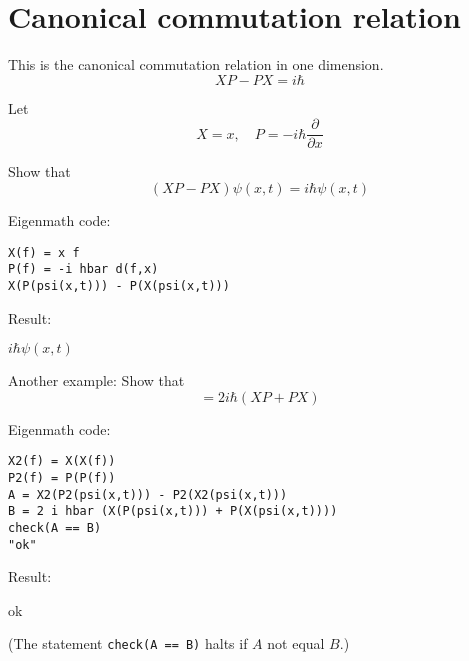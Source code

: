 

\section*{Canonical commutation relation}

This is the canonical commutation relation in one dimension.
\begin{equation*}
XP-PX=i\hbar
\end{equation*}

Let
\begin{equation*}
X=x,\quad P=-i\hbar\frac{\partial}{\partial x}
\end{equation*}

Show that
\begin{equation*}
(XP-PX)\psi(x,t)=i\hbar\psi(x,t)
\end{equation*}

\iffalse
Then
\begin{align*}
(XP-PX)\psi(x,t)&=XP\psi(x,t)-PX\psi(x,t)
\\
&=x\left(-i\hbar\frac{\partial}{\partial x}\psi(x,t)\right)
+i\hbar\frac{\partial}{\partial x}\bigl(x\psi(x,t)\bigr)
\\
&=-i\hbar x\frac{\partial}{\partial x}\psi(x,t)
+i\hbar\left(\frac{\partial}{\partial x}x\right)\psi(x,t)
+i\hbar x\frac{\partial}{\partial x}\psi(x,t)
\\
&=i\hbar\psi(x,t)
\end{align*}
\fi

Eigenmath code:
{\color{blue}
\begin{verbatim}
X(f) = x f
P(f) = -i hbar d(f,x)
X(P(psi(x,t))) - P(X(psi(x,t)))
\end{verbatim}}

Result:

\bigskip
$i\hbar\psi(x,t)$

\bigskip
Another example: Show that
\begin{equation*}
[X^2,P^2]=2i\hbar(XP+PX)
\end{equation*}

Eigenmath code:
{\color{blue}
\begin{verbatim}
X2(f) = X(X(f))
P2(f) = P(P(f))
A = X2(P2(psi(x,t))) - P2(X2(psi(x,t)))
B = 2 i hbar (X(P(psi(x,t))) + P(X(psi(x,t))))
check(A == B)
"ok"
\end{verbatim}}

Result:

\bigskip
ok

\bigskip
(The statement {\tt check(A == B)} halts if $A$ not equal $B$.)

